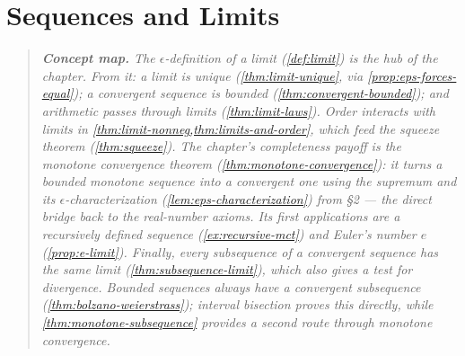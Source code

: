 \section{Sequences and Limits}

\begin{quote}\small\itshape
\textbf{Concept map.}
The $\epsilon$-definition of a limit (\cref{def:limit}) is the hub of the
chapter. From it: a limit is unique (\cref{thm:limit-unique}, via
\cref{prop:eps-forces-equal}); a convergent sequence is bounded
(\cref{thm:convergent-bounded}); and arithmetic passes through limits
(\cref{thm:limit-laws}). Order interacts with limits in
\cref{thm:limit-nonneg,thm:limits-and-order}, which feed the squeeze
theorem (\cref{thm:squeeze}). The chapter's completeness payoff is the
monotone convergence theorem (\cref{thm:monotone-convergence}): it turns a
bounded monotone sequence into a convergent one using the supremum and its
$\epsilon$-characterization (\cref{lem:eps-characterization}) from \S2 ---
the direct bridge back to the real-number axioms. Its first applications
are a recursively defined sequence (\cref{ex:recursive-mct}) and Euler's
number $e$ (\cref{prop:e-limit}). Finally, every subsequence of a
convergent sequence has the same limit (\cref{thm:subsequence-limit}),
which also gives a test for divergence. Bounded sequences always have a
convergent subsequence (\cref{thm:bolzano-weierstrass}); interval bisection
proves this directly, while \cref{thm:monotone-subsequence} provides a
second route through monotone convergence.
\end{quote}





